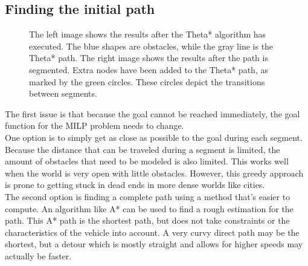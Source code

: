 \subsection{Finding the initial path}
\begin{figure}[!t]
    \centering
    \hfil
    \caption{The left image shows the results after the Theta* algorithm has executed. The blue shapes are obstacles, while the gray line is the Theta* path. The right image shows the results after the path is segmented. Extra nodes have been added to the Theta* path, as marked by the green circles. These circles depict the transitions between segments.}\label{fig:pre-1-2}
\end{figure}
The first issue is that because the goal cannot be reached immediately, the goal function for the MILP problem needs to change.  \\
One option is to simply get as close as possible to the goal during each segment. Because the distance that can be traveled during a segment is limited, the amount of obstacles that need to be modeled is also limited. This works well when the world is very open with little obstacles. However, this greedy approach is prone to getting stuck in dead ends in more dense worlds like cities.
\\
The second option is finding a complete path using a method that's easier to compute. An algorithm like A* can be used to find a rough estimation for the path. This A* path is the shortest path, but does not take constraints or the characteristics of the vehicle into account. A very curvy direct path may be the shortest, but a detour which is mostly straight and allows for higher speeds may actually be faster. 
